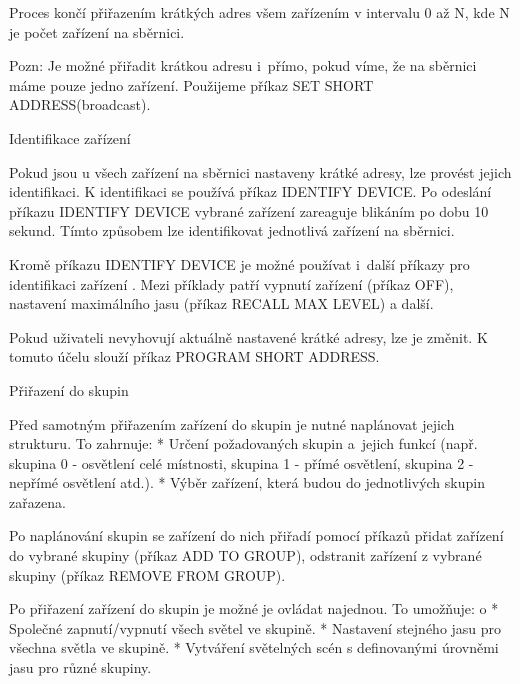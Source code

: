 Proces končí přiřazením krátkých adres všem zařízením v intervalu 0 až N, kde N je počet zařízení na sběrnici.

Pozn: Je možné přiřadit krátkou adresu i~přímo, pokud víme, že na sběrnici máme pouze jedno zařízení.
Použijeme příkaz SET SHORT ADDRESS(broadcast).

\medskip \noindent
{\sbf Identifikace zařízení}

Pokud jsou u všech zařízení na sběrnici  nastaveny krátké adresy, lze provést jejich identifikaci.
K identifikaci se používá příkaz IDENTIFY DEVICE.
Po odeslání příkazu IDENTIFY DEVICE vybrané zařízení zareaguje blikáním po dobu 10 sekund.
Tímto způsobem lze identifikovat jednotlivá zařízení na sběrnici.


Kromě příkazu IDENTIFY DEVICE je možné používat i~další příkazy pro identifikaci zařízení .
Mezi příklady patří vypnutí zařízení (příkaz OFF), nastavení maximálního jasu (příkaz RECALL MAX LEVEL)
a další.

Pokud uživateli nevyhovují aktuálně nastavené krátké adresy, lze je změnit.
K tomuto účelu slouží příkaz PROGRAM SHORT ADDRESS.


\medskip \noindent
{\sbf Přiřazení do skupin}







Před samotným přiřazením zařízení do skupin je nutné naplánovat jejich strukturu. To zahrnuje:
\begitems
    * Určení požadovaných skupin a~jejich funkcí
    (např. skupina 0 - osvětlení celé místnosti, skupina 1 - přímé osvětlení, skupina 2 - nepřímé osvětlení atd.).
    * Výběr zařízení, která budou do jednotlivých skupin zařazena.
\enditems


Po naplánování skupin se zařízení do nich přiřadí pomocí příkazů
přidat zařízení do vybrané skupiny (příkaz ADD TO GROUP),
odstranit zařízení z vybrané skupiny (příkaz REMOVE FROM GROUP).

\noindent
Po přiřazení zařízení do skupin je možné je ovládat najednou. To umožňuje:
\begitems \style o
    * Společné zapnutí/vypnutí všech světel ve skupině.
    * Nastavení stejného jasu pro všechna světla ve skupině.
    * Vytváření světelných scén s definovanými úrovněmi jasu pro různé skupiny.
\enditems

